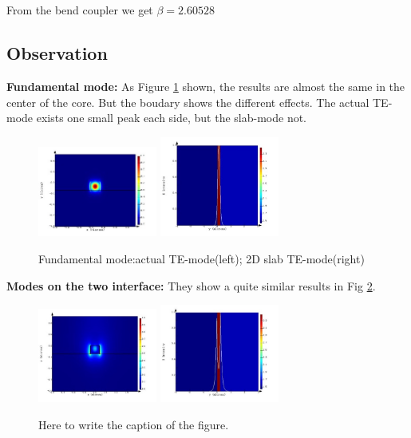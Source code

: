 \documentclass[fontsize=11pt]{scrartcl}
\begin{document}
\subsection{}
From the bend coupler we get $\beta=2.60528$
\subsection{Observation}
\textbf{Fundamental mode:} As Figure \ref{fig1.1} shown, 
the results are almost the same in the center of the core. 
But the boudary shows the different effects. 
The actual TE-mode exists one small peak each side, but the slab-mode not.
\begin{figure}[H]
    \centering
     \includegraphics[width=0.35\textwidth]{img/fig1.1a.jpg} %
     \includegraphics[width=0.35\textwidth]{img/fig1.1b.jpg}
     \caption{Fundamental mode:actual TE-mode(left); 2D slab TE-mode(right)}
     \label{fig1.1}
\end{figure}
\textbf{Modes on the two interface:} They show a quite similar results in Fig \ref{fig1.2}.
\begin{figure}[H]
    \centering
     \includegraphics[width=0.35\textwidth]{img/fig1.2a.jpg} %
     \includegraphics[width=0.35\textwidth]{img/fig1.2b.jpg}
     \caption{Here to write the caption of the figure.}
     \label{fig1.2}
\end{figure} 
\end{document}

